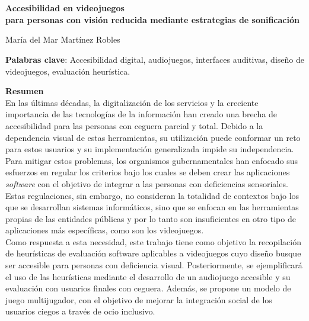 \thispagestyle{empty}
\chapter*{}
\thispagestyle{empty}

\begin{center}
{\large\bfseries Accesibilidad en videojuegos \\ para personas con visión reducida mediante estrategias de
sonificación }\\
\end{center}
\begin{center}
María del Mar Martínez Robles\\
\end{center}

\thispagestyle{empty}
\vspace{0.5cm}
\noindent\textbf{Palabras clave}: Accesibilidad digital, audiojuegos, interfaces auditivas, diseño de videojuegos, evaluación heurística.
\vspace{0.7cm}

\noindent\textbf{Resumen}\\
	
	En las últimas décadas, la digitalización de los servicios y la creciente importancia de las tecnologías de la información han creado una brecha de accesibilidad para las personas con ceguera parcial y total. Debido a la dependencia visual de estas herramientas, su utilización puede conformar un reto para estos usuarios y su implementación generalizada impide su independencia. Para mitigar estos problemas, los organismos gubernamentales han enfocado sus esfuerzos en regular los criterios bajo los cuales se deben crear las aplicaciones \textit{software} con el objetivo de integrar a las personas con deficiencias sensoriales. Estas regulaciones, sin embargo, no consideran la totalidad de contextos bajo los que se desarrollan sistemas informáticos, sino que se enfocan en las herramientas propias de las entidades públicas y por lo tanto son insuficientes en otro tipo de aplicaciones más específicas, como son los videojuegos. \\
	
	Como respuesta a esta necesidad, este trabajo tiene como objetivo la recopilación de heurísticas de evaluación software aplicables a videojuegos cuyo diseño busque ser accesible para personas con deficiencia visual. Posteriormente, se ejemplificará el uso de las heurísticas mediante el desarrollo de un audiojuego accesible y su evaluación con usuarios finales con ceguera. Además, se propone un modelo de juego multijugador, con el objetivo de mejorar la integración social de los usuarios ciegos a través de ocio inclusivo.\\
	
